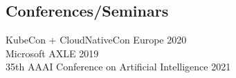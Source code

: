 \documentclass[]{deedy-resume-openfont}
\begin{document}
\begin{minipage}[t]{0.30\textwidth}
\sectionsep

\subsection{Conferences/Seminars    }
\textbullet{} KubeCon + CloudNativeCon Europe 2020 \\
\textbullet{} Microsoft AXLE 2019 \\
\textbullet{} 35th AAAI Conference on Artificial Intelligence 2021




%
%

\end{minipage} 
\hfill
\end{document}
